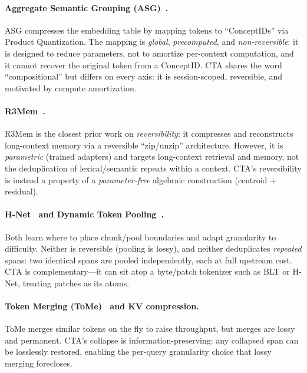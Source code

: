 \documentclass[11pt]{article}
\begin{document}
\paragraph{Aggregate Semantic Grouping (ASG)~\cite{asg}.} ASG compresses the embedding
table by mapping tokens to ``ConceptIDs'' via Product Quantization. The mapping is
\emph{global}, \emph{precomputed}, and \emph{non-reversible}: it is designed to reduce
parameters, not to amortize per-context computation, and it cannot recover the original
token from a ConceptID. CTA shares the word ``compositional'' but differs on every axis:
it is session-scoped, reversible, and motivated by compute amortization.

\paragraph{R3Mem~\cite{r3mem}.} R3Mem is the closest prior work on \emph{reversibility}: it
compresses and reconstructs long-context memory via a reversible ``zip/unzip''
architecture. However, it is \emph{parametric} (trained adapters) and targets long-context
retrieval and memory, not the deduplication of lexical/semantic repeats within a context.
CTA's reversibility is instead a property of a \emph{parameter-free} algebraic
construction (centroid $+$ residual).

\paragraph{H-Net~\cite{hnet} and Dynamic Token Pooling~\cite{dtp}.} Both learn where to
place chunk/pool boundaries and adapt granularity to difficulty. Neither is reversible
(pooling is lossy), and neither deduplicates \emph{repeated} spans: two identical spans are
pooled independently, each at full upstream cost. CTA is complementary---it can sit atop a
byte/patch tokenizer such as BLT or H-Net, treating patches as its atoms.

\paragraph{Token Merging (ToMe)~\cite{tome} and KV compression.} ToMe merges similar tokens
on the fly to raise throughput, but merges are lossy and permanent. CTA's collapse is
information-preserving: any collapsed span can be losslessly restored, enabling the
per-query granularity choice that lossy merging forecloses.
\end{document}
